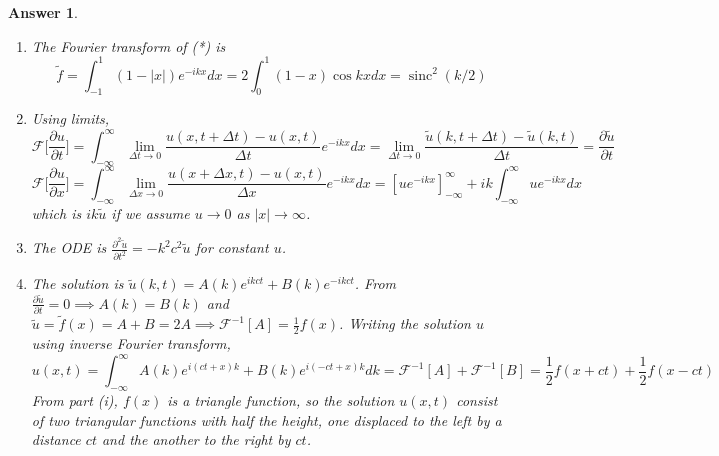 \documentclass[a4paper]{article}
\DeclareMathOperator{\sinc}{sinc}
\newtheorem{ans}{Answer}[section]
\theoremstyle{new}
\begin{document}
\begin{ans}\leavevmode
\begin{enumerate}[label=(\roman*)]
\item The Fourier transform of (*) is
$$\tilde{f}=\int_{-1}^1(1-|x|)e^{-ikx}dx=2\int_0^1(1-x)\cos kx dx=\sinc^2(k/2)$$
\item Using limits,
$$\mathcal{F}\bigg[\frac{\partial u}{\partial t}\bigg]=\int_{-\infty}^\infty\lim_{\Delta t\rightarrow 0}\frac{u(x,t+\Delta t)-u(x,t)}{\Delta t}e^{-ikx}dx=\lim_{\Delta t\rightarrow 0}\frac{\tilde{u}(k,t+\Delta t)-\tilde{u}(k,t)}{\Delta t}=\frac{\partial\tilde{u}}{\partial t}$$
$$\mathcal{F}\bigg[\frac{\partial u}{\partial x}\bigg]=\int_{-\infty}^\infty\lim_{\Delta x\rightarrow 0}\frac{u(x+\Delta x,t)-u(x,t)}{\Delta x}e^{-ikx}dx=[ue^{-ikx}]_{-\infty}^\infty+ik\int_{-\infty}^\infty ue^{-ikx}dx$$
which is $ik\tilde{u}$ if we assume $u\rightarrow 0$ as $|x|\rightarrow\infty$.
\item The ODE is $\frac{\partial^2\tilde{u}}{\partial t^2}=-k^2c^2\tilde{u}$ for constant $u$.
\item The solution is $\tilde{u}(k,t)=A(k)e^{ikct}+B(k)e^{-ikct}$. From $\frac{\partial\tilde{u}}{\partial t}=0\implies A(k)=B(k)$ and $\tilde{u}=\tilde{f}(x)=A+B=2A\implies\mathcal{F}^{-1}[A]=\frac{1}{2}f(x)$. Writing the solution $u$ using inverse Fourier transform,
$$u(x,t)=\int_{-\infty}^\infty A(k)e^{i(ct+x)k}+B(k)e^{i(-ct+x)k}dk=\mathcal{F}^{-1}[A]+\mathcal{F}^{-1}[B]=\frac{1}{2}f(x+ct)+\frac{1}{2}f(x-ct)$$
From part (i), $f(x)$ is a triangle function, so the solution $u(x,t)$ consist of two triangular functions with half the height, one displaced to the left by a distance $ct$ and the another to the right by $ct$.
\end{enumerate}
\end{ans}
\newpage
\end{document}
